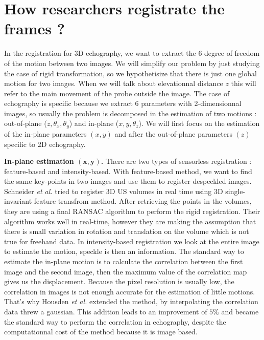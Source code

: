 \documentclass[runningheads,a4paper]{llncs}
\begin{document}
\section{How researchers registrate the frames ?}
In the registration for 3D echography, we want to extract the 6 degree of freedom of the motion between two images. We will simplify our problem by just studying the case of rigid transformation, so we hypothetisize that there is just one global motion for two images. When we will talk about elevationnal distance $z$ this will refer to the main movement of the probe outside the image.
The case of echography is specific because we extract 6 parameters with 2-dimensionnal images, so usually the problem is
decomposed in the estimation of two motions \cite{tuthill1998automated} : out-of-plane ($z, \theta_x, \theta_y$) and in-plane ($x, y, \theta_z$). We will first focus on the estimation of the in-plane parameters $(x,y)$ and after the out-of-plane parameters $(z)$ specific to 2D echography.\par
\textbf{In-plane estimation $\mathbf{(x,y)}$.} There are two types of sensorless registration : feature-based and intensity-based. With feature-based method, we want to find the same key-points in two images and use them to register despeckled images. 
Schneider \textit{et al.} \cite{schneider2012real} tried to register 3D US volumes in real time using 3D single-invariant feature transfrom method. 
After retrieving the points in the volumes, they are using a final RANSAC algorithm to perform the rigid registration. 
Their algorithm works well in real-time, however they are making the assumption that there is small variation in rotation and translation on the volume which is not true for freehand data. In intensity-based registration we look at the entire image to estimate the motion, speckle is then an information.
The standard way to estimate the in-plane motion is to calculate the correlation between the first image and the second image, then the maximum value of the correlation map gives us the displacement. Because the pixel resolution is usually low, the correlation in images is not enough accurate for the estimation of little motions.
That's why Housden \textit{et al.} \cite{housden2006subsample} extended the method, by interpolating the correlation data threw a gaussian. This addition leads to an improvement of $5\%$ and became the standard way to perform the correlation in echography, despite the computationnal cost of the method because it is image based. 
\end{document}
